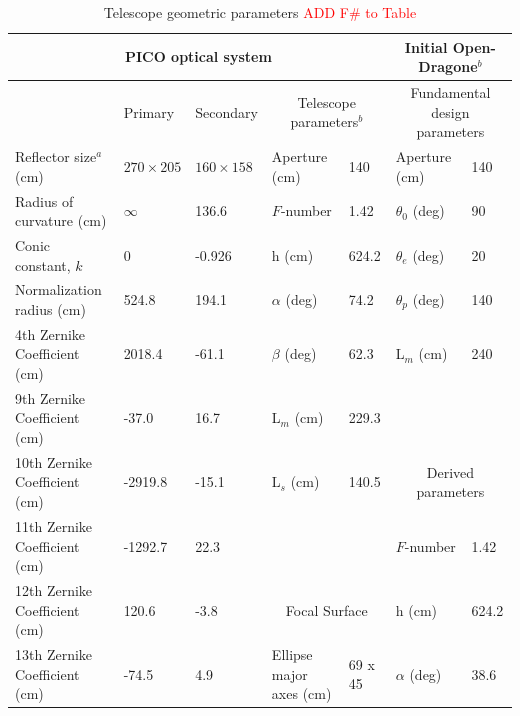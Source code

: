 \documentclass[]{spie}  %
\newcommand{\comr}[1]{\textcolor{red}{#1}}
\begin{document}
\begin{table}[ht]
\centering
\caption{Telescope geometric parameters  \comr{ADD F\# to Table} \label{tab:optics}}

\begin{adjustbox}{width=1.05\textwidth}
\hspace{-1cm}
\begin{tabular}{|l|llll||ll|}
\hline
\multicolumn{5}{|c||}{PICO optical system}                                    & \multicolumn{2}{c|}{Initial Open-Dragone$^b$}     \\ \hline
                          & Primary           & Secondary    & \multicolumn{2}{c||}{Telescope parameters$^b$} & \multicolumn{2}{c|}{Fundamental design parameters}  \\
Reflector size$^a$ (cm)      & $270 \times 205$ & $160 \times 158$ & Aperture (cm)           & 140      & Aperture (cm)                  & 140   \\
Radius of curvature (cm)  & $\infty$         & 136.6             & $F$-number             & 1.42     & $\theta_0$ (deg)           & 90    \\
Conic constant, $k$       & 0                 & -0.926            & h (cm)                    & 624.2    & $\theta_e$ (deg)           & 20    \\
Normalization radius (cm) & 524.8             & 194.1             & $\alpha$ (deg)            & 74.2     & $\theta_p$ (deg)           & 140   \\
4th Zernike Coefficient (cm)  & 2018.4            & -61.1             & $\beta$  (deg)            &  62.3    & L$_m$ (cm)                     & 240   \\
9th Zernike Coefficient (cm)  & -37.0             & 16.7              & L$_m$ (cm)                &   229.3  &                                &         \\
10th Zernike Coefficient (cm) & -2919.8           & -15.1             & L$_s$ (cm)                &   140.5  & \multicolumn{2}{c|}{Derived parameters} \\ 
11th Zernike Coefficient (cm) & -1292.7           & 22.3              &                           &          & $F$-number                     & 1.42  \\   
12th Zernike Coefficient (cm) & 120.6             & -3.8             &   \multicolumn{2}{c||}{Focal Surface}  & h (cm)                         & 624.2 \\   
13th Zernike Coefficient (cm) & -74.5             & 4.9               & Ellipse major axes (cm)   & 69 x 45  & $\alpha$ (deg)                 & 38.6  \\   

\end{tabular}
\end{adjustbox}
\end{table}
\end{document}
